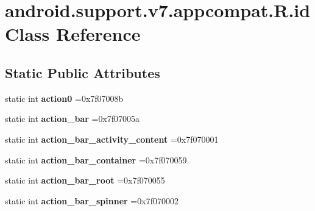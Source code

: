 \hypertarget{classandroid_1_1support_1_1v7_1_1appcompat_1_1R_1_1id}{}\section{android.\+support.\+v7.\+appcompat.\+R.\+id Class Reference}
\label{classandroid_1_1support_1_1v7_1_1appcompat_1_1R_1_1id}
\subsection*{Static Public Attributes}
\begin{DoxyCompactItemize}
\item 
\mbox{\label{classandroid_1_1support_1_1v7_1_1appcompat_1_1R_1_1id_aa3c4b5af50fb067cab8b62c647ea0589}} 
static int {\bfseries action0} =0x7f07008b
\item 
\mbox{\label{classandroid_1_1support_1_1v7_1_1appcompat_1_1R_1_1id_af800d3db90d2dc3c93146e21c7ccffc4}} 
static int {\bfseries action\+\_\+bar} =0x7f07005a
\item 
\mbox{\label{classandroid_1_1support_1_1v7_1_1appcompat_1_1R_1_1id_aaf8a1f52eabcd67565ceb98998758c72}} 
static int {\bfseries action\+\_\+bar\+\_\+activity\+\_\+content} =0x7f070001
\item 
\mbox{\label{classandroid_1_1support_1_1v7_1_1appcompat_1_1R_1_1id_a3865032465192b60ddfcf641dc4ffe12}} 
static int {\bfseries action\+\_\+bar\+\_\+container} =0x7f070059
\item 
\mbox{\label{classandroid_1_1support_1_1v7_1_1appcompat_1_1R_1_1id_a6e56dbc276ac01aa3ffce169c08c07bb}} 
static int {\bfseries action\+\_\+bar\+\_\+root} =0x7f070055
\item 
\mbox{\label{classandroid_1_1support_1_1v7_1_1appcompat_1_1R_1_1id_a313d8069ce22bc64170da96ae2129070}} 
static int {\bfseries action\+\_\+bar\+\_\+spinner} =0x7f070002
\item 

\end{DoxyCompactItemize}
